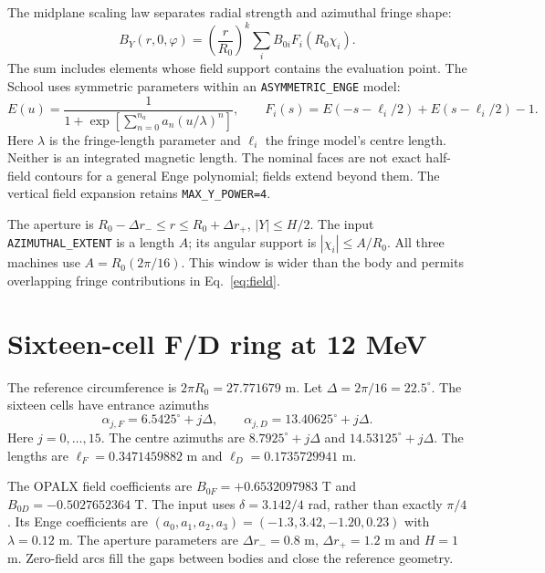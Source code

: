 \documentclass[11pt,a4paper]{article}
\newcommand{\degunit}{^{\circ}}
\begin{document}
The midplane scaling law separates radial strength and azimuthal fringe shape:
\begin{equation}
 B_Y(r,0,\varphi)=\left(\frac{r}{R_0}\right)^k\sum_i B_{0i}F_i(R_0\chi_i).
 \label{eq:field}
\end{equation}
The sum includes elements whose field support contains the evaluation point.
The School uses symmetric parameters within an \texttt{ASYMMETRIC\_ENGE} model:
\begin{equation}
 E(u)=\frac{1}{1+\exp[\sum_{n=0}^{n_a}a_n(u/\lambda)^n]},\qquad
 F_i(s)=E(-s-\ell_i/2)+E(s-\ell_i/2)-1.
 \label{eq:enge}
\end{equation}
Here $\lambda$ is the fringe-length parameter and $\ell_i$ the fringe model's
centre length. Neither is an integrated magnetic length. The nominal faces are
not exact half-field contours for a general Enge polynomial; fields extend
beyond them. The vertical field expansion retains
\texttt{MAX\_Y\_POWER=4}.

The aperture is $R_0-\Delta r_-\leq r\leq R_0+\Delta r_+$,
$|Y|\leq H/2$. The input \texttt{AZIMUTHAL\_EXTENT} is a length $A$; its angular
support is $|\chi_i|\leq A/R_0$. All three machines use
$A=R_0(2\pi/16)$. This window is wider than the body and permits overlapping
fringe contributions in Eq.~\eqref{eq:field}.

\clearpage
\section{Sixteen-cell F/D ring at 12 MeV}
The reference circumference is $2\pi R_0=27.771679$ m. Let
$\Delta=2\pi/16=22.5\degunit$. The sixteen cells have entrance azimuths
\begin{equation}
 \boxed{\alpha_{j,F}=6.5425\degunit+j\Delta,\qquad
        \alpha_{j,D}=13.40625\degunit+j\Delta.}
 \label{eq:uniform}
\end{equation}
Here $j=0,\ldots,15$. The centre azimuths are $8.7925\degunit+j\Delta$ and
$14.53125\degunit+j\Delta$. The lengths are $\ell_F=0.3471459882$ m and
$\ell_D=0.1735729941$ m.

The OPALX field coefficients are $B_{0F}=+0.6532097983$ T and
$B_{0D}=-0.5027652364$ T. The input uses $\delta=3.142/4$ rad, rather than exactly
$\pi/4$. Its Enge coefficients are
$(a_0,a_1,a_2,a_3)=(-1.3,3.42,-1.20,0.23)$ with $\lambda=0.12$ m.
The aperture parameters are $\Delta r_-=0.8$ m, $\Delta r_+=1.2$ m and $H=1$ m.
Zero-field arcs fill the gaps between bodies and close the reference geometry.
\end{document}
